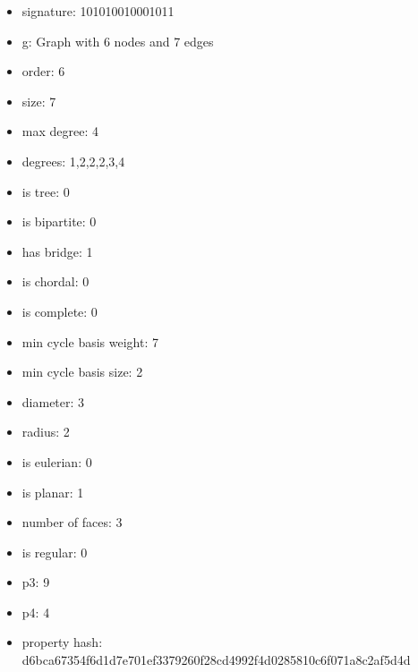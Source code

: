 \begin{itemize}
\item signature: 101010010001011
\item g: Graph with 6 nodes and 7 edges
\item order: 6
\item size: 7
\item max degree: 4
\item degrees: 1,2,2,2,3,4
\item is tree: 0
\item is bipartite: 0
\item has bridge: 1
\item is chordal: 0
\item is complete: 0
\item min cycle basis weight: 7
\item min cycle basis size: 2
\item diameter: 3
\item radius: 2
\item is eulerian: 0
\item is planar: 1
\item number of faces: 3
\item is regular: 0
\item p3: 9
\item p4: 4
\item property hash: d6bca67354f6d1d7e701ef3379260f28cd4992f4d0285810c6f071a8c2af5d4d
\end{itemize}
\newpage
\begin{figure}
\end{figure}

